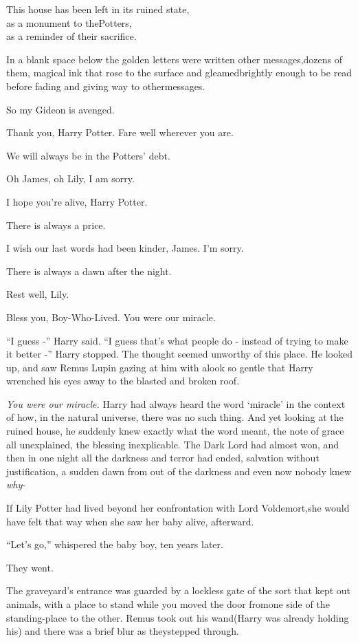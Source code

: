 This house has been left in its ruined state,\\ as a monument to thePotters,\\ as a reminder of their sacrifice.

In a blank space below the golden letters were written other messages,dozens of them, magical ink that rose to the surface and gleamedbrightly enough to be read before fading and giving way to othermessages.

So my Gideon is avenged.

Thank you, Harry Potter. Fare well wherever you are.

We will always be in the Potters' debt.

Oh James, oh Lily, I am sorry.

I hope you're alive, Harry Potter.

There is always a price.

I wish our last words had been kinder, James. I'm sorry.

There is always a dawn after the night.

Rest well, Lily.

Bless you, Boy-Who-Lived. You were our miracle.

``I guess -'' Harry said. ``I guess that's what people do - instead of trying to make it better -'' Harry stopped. The thought seemed unworthy of this place. He looked up, and saw Remus Lupin gazing at him with alook so gentle that Harry wrenched his eyes away to the blasted and broken roof.

\emph{You were our miracle.} Harry had always heard the word `miracle' in the context of how, in the natural universe, there was no such thing. And yet looking at the ruined house, he suddenly knew exactly what the word meant, the note of grace all unexplained, the blessing inexplicable. The Dark Lord had almost won, and then in one night all the darkness and terror had ended, salvation without justification, a sudden dawn from out of the darkness and even now nobody knew \emph{why}-

If Lily Potter had lived beyond her confrontation with Lord Voldemort,she would have felt that way when she saw her baby alive, afterward.

``Let's go,'' whispered the baby boy, ten years later.

They went.

The graveyard's entrance was guarded by a lockless gate of the sort that kept out animals, with a place to stand while you moved the door fromone side of the standing-place to the other. Remus took out his wand(Harry was already holding his) and there was a brief blur as theystepped through.


